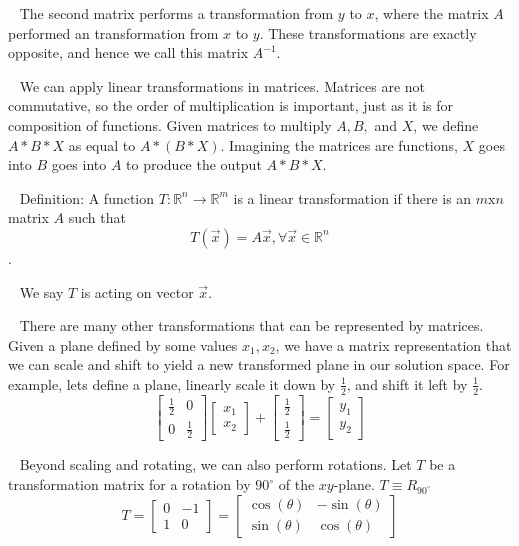 \documentclass[12pt]{article}
\begin{document}
$\,\,\,$ The second matrix performs a transformation from $y$ to $x$, where the matrix $A$ performed an transformation from $x$ to $y$. These transformations are exactly opposite, and hence we call this matrix $A^{-1}$.

$\,\,\,$ We can apply linear transformations in matrices. Matrices are not commutative, so the order of multiplication is important, just as it is for composition of functions. Given matrices to multiply $A,B,$ and $X$, we define $A*B*X$ as equal to $A*(B*X)$. Imagining the matrices are functions, $X$ goes into $B$ goes into $A$ to produce the output $A*B*X$.

$\,\,\,$ Definition: A function $T:\mathbb{R}^n\rightarrow\mathbb{R}^m$ is a linear transformation if there is an $m\text{x}n$ matrix $A$ such that $$T(\vec{x})=A\vec{x},\forall \vec{x}\in\mathbb{R}^n$$. 

$\,\,\,$ We say $T$ is acting on vector $\vec{x}$.

$\,\,\,$ There are many other transformations that can be represented by matrices. Given a plane defined by some values $x_1,x_2$, we have a matrix representation that we can scale and shift to yield a new transformed plane in our solution space. For example, lets define a plane, linearly scale it down by $\frac{1}{2}$, and shift it left by $\frac{1}{2}$.
$$\begin{bmatrix}
\frac{1}{2} & 0\\ 0 & \frac{1}{2}
\end{bmatrix}
\begin{bmatrix}
x_1\\x_2
\end{bmatrix}+\begin{bmatrix}
\frac{1}{2}\\ \frac{1}{2}
\end{bmatrix}
=\begin{bmatrix}
y_1\\y_2
\end{bmatrix}
$$

$\,\,\,$ Beyond scaling and rotating, we can also perform rotations. Let $T$ be a transformation matrix for a rotation by $90^{\circ}$ of the $xy$-plane. $T\equiv R_{90^\circ}$ $$T=\begin{bmatrix}
0 & -1\\1 & 0
\end{bmatrix}=\begin{bmatrix}
\cos(\theta) & -\sin(\theta)\\ \sin(\theta) & \cos(\theta)
\end{bmatrix}$$
\end{document}

